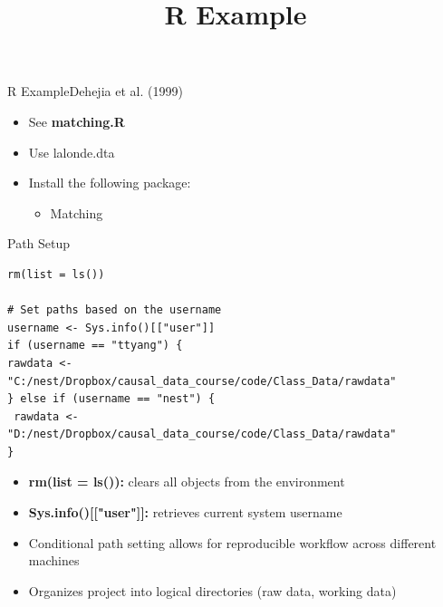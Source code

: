 \documentclass[hyperref={pdfpagelabels=false}]{beamer}
\begin{document}
\title[]  
{R Example}


\author 
{}

\institute{}






\date
{}


\begin{frame}{}
	\titlepage
\end{frame}



\begin{frame}{R Example}{Dehejia et al. (1999)}
	\begin{itemize}
		\item See \textbf{matching.R}
		\vspace{0.2cm}
		\item Use lalonde.dta
		\vspace{0.2cm}
		\item Install the following package:
		\begin{itemize}
			\vspace{0.2cm}
			\item Matching 
		\end{itemize}
		
	\end{itemize}
\end{frame}



\begin{frame}[fragile]{Path Setup}{}
\begin{lstlisting}
rm(list = ls())

# Set paths based on the username
username <- Sys.info()[["user"]]
if (username == "ttyang") {
rawdata <- "C:/nest/Dropbox/causal_data_course/code/Class_Data/rawdata"
} else if (username == "nest") {
 rawdata <- "D:/nest/Dropbox/causal_data_course/code/Class_Data/rawdata"
}
\end{lstlisting}
	\begin{itemize}
		\vspace{0.2cm}
		\item \textbf{rm(list = ls()):} clears all objects from the environment
		\vspace{0.2cm}
		\item \textbf{Sys.info()[["user"]]:} retrieves current system username
		\vspace{0.2cm}
		\item Conditional path setting allows for reproducible workflow across different machines
		\vspace{0.2cm}
		\item Organizes project into logical directories (raw data, working data)
	\end{itemize}
\end{frame}
\end{document}
